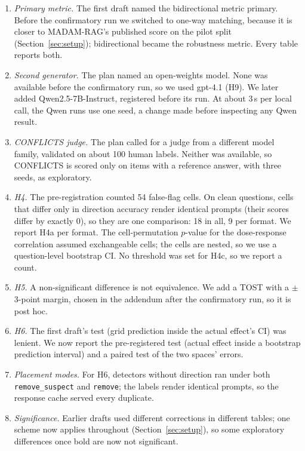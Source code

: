\begin{enumerate}[leftmargin=*,itemsep=1pt,topsep=2pt]
\item \emph{Primary metric.} The first draft named the bidirectional metric primary. Before
the confirmatory run we switched to one-way matching, because it is closer to MADAM-RAG's published score on the pilot
split (Section~\ref{sec:setup}); bidirectional became the robustness metric. Every table reports both.
\item \emph{Second generator.} The plan named an open-weights model. None was available before the confirmatory run, so
we used gpt-4.1 (H9). We later added Qwen2.5-7B-Instruct, registered before its run. At about 3\,s per local
call, the Qwen runs use one seed, a change made before inspecting any Qwen result.
\item \emph{CONFLICTS judge.} The plan called for a judge from a different model family, validated on about 100 human
labels. Neither was available, so CONFLICTS is scored only on items with a reference answer,
with three seeds, as exploratory.
\item \emph{H4.} The pre-registration counted 54 false-flag cells. On clean questions, cells that differ only in
direction accuracy render identical prompts (their scores differ by exactly 0), so they are one comparison: 18 in
all, 9 per format. We report H4a per format. The cell-permutation $p$-value for the dose-response correlation assumed
exchangeable cells; the cells are nested, so we use a question-level bootstrap CI. No threshold was set
for H4c, so we report a count.
\item \emph{H5.} A non-significant difference is not equivalence. We add a TOST with a $\pm$3-point margin, chosen in
the addendum after the confirmatory run, so it is post hoc.
\item \emph{H6.} The first draft's test (grid prediction inside the actual effect's CI) was
lenient. We now report the pre-registered test (actual effect inside a bootstrap prediction interval) and a paired test
of the two spaces' errors.
\item \emph{Placement modes.} For H6, detectors without direction ran under both
\texttt{remove\_suspect} and \texttt{remove}; the labels render identical prompts, so the response cache served every
duplicate.
\item \emph{Significance.} Earlier drafts used different corrections in different tables; one scheme now applies
throughout (Section~\ref{sec:setup}), so some exploratory differences once bold are now
not significant.

\end{enumerate}
